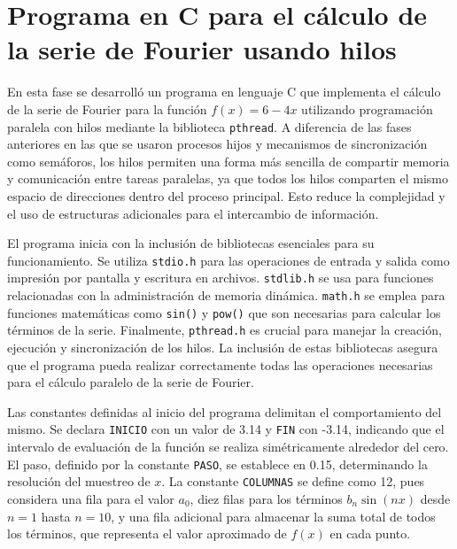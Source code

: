 {%
\section{Programa en C para el cálculo de la serie de Fourier usando hilos}

En esta fase se desarrolló un programa en lenguaje C que implementa el cálculo de la serie de Fourier para la función $f(x) = 6 - 4x$ utilizando programación paralela con hilos mediante la biblioteca \texttt{pthread}. A diferencia de las fases anteriores en las que se usaron procesos hijos y mecanismos de sincronización como semáforos, los hilos permiten una forma más sencilla de compartir memoria y comunicación entre tareas paralelas, ya que todos los hilos comparten el mismo espacio de direcciones dentro del proceso principal. Esto reduce la complejidad y el uso de estructuras adicionales para el intercambio de información.

El programa inicia con la inclusión de bibliotecas esenciales para su funcionamiento. Se utiliza \texttt{stdio.h} para las operaciones de entrada y salida como impresión por pantalla y escritura en archivos. \texttt{stdlib.h} se usa para funciones relacionadas con la administración de memoria dinámica. \texttt{math.h} se emplea para funciones matemáticas como \texttt{sin()} y \texttt{pow()} que son necesarias para calcular los términos de la serie. Finalmente, \texttt{pthread.h} es crucial para manejar la creación, ejecución y sincronización de los hilos. La inclusión de estas bibliotecas asegura que el programa pueda realizar correctamente todas las operaciones necesarias para el cálculo paralelo de la serie de Fourier.

Las constantes definidas al inicio del programa delimitan el comportamiento del mismo. Se declara \texttt{INICIO} con un valor de 3.14 y \texttt{FIN} con -3.14, indicando que el intervalo de evaluación de la función se realiza simétricamente alrededor del cero. El paso, definido por la constante \texttt{PASO}, se establece en 0.15, determinando la resolución del muestreo de $x$. La constante \texttt{COLUMNAS} se define como 12, pues considera una fila para el valor $a_0$, diez filas para los términos $b_n \sin(nx)$ desde $n = 1$ hasta $n = 10$, y una fila adicional para almacenar la suma total de todos los términos, que representa el valor aproximado de $f(x)$ en cada punto.

}

